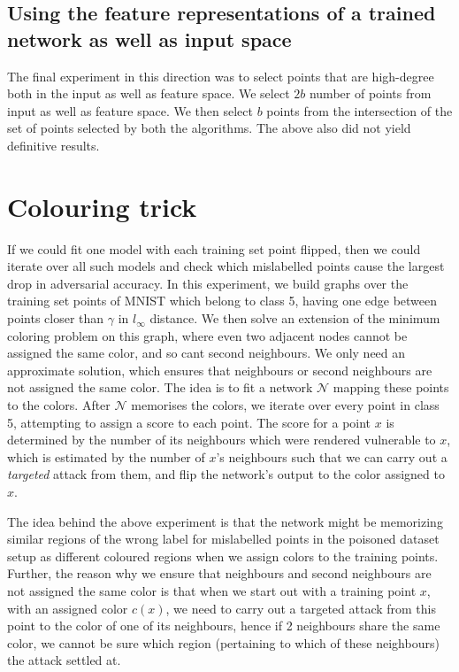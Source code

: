 \documentclass{ociamthesis}
\begin{document}
\subsection{Using the feature representations of a trained network as well as input space}

The final experiment in this direction was to select points that are high-degree
both in the input as well as feature space. We select $2b$ number of points from
input as well as feature space. We then select $b$ points from the intersection
of the set of points selected by both the algorithms. The above also did not
yield definitive results.


\section{Colouring trick}
If we could fit one model with each training set point flipped, then we could
iterate over all such models and check which mislabelled points cause the
largest drop in adversarial accuracy. In this experiment, we build graphs over
the training set points of MNIST which belong to class 5, having one edge
between points closer than $\gamma$ in $l_\infty$ distance. We then solve an
extension of the minimum coloring problem on this graph, where even two adjacent
nodes cannot be assigned the same color, and so cant second neighbours. We only
need an approximate solution, which ensures that neighbours or second neighbours
are not assigned the same color. The idea is to fit a network $\mathcal{N}$
mapping these points to the colors. After $\mathcal{N}$ memorises the colors, we
iterate over every point in class 5, attempting to assign a score to each point.
The score for a point $x$ is determined by the number of its neighbours which
were rendered vulnerable to $x$, which is estimated by the number of $x$'s
neighbours such that we can carry out a \emph{targeted} attack from them, and
flip the network's output to the color assigned to $x$.

The idea behind the above experiment is that the network might be memorizing
similar regions of the wrong label for mislabelled points in the poisoned
dataset setup as different coloured regions when we assign colors to the
training points. Further, the reason why we ensure that neighbours and second
neighbours are not assigned the same color is that when we start out with a
training point $x$, with an assigned color $c(x)$, we need to carry out a
targeted attack from this point to the color of one of its neighbours, hence if
2 neighbours share the same color, we cannot be sure which region (pertaining to
which of these neighbours) the attack settled at.
\end{document}
